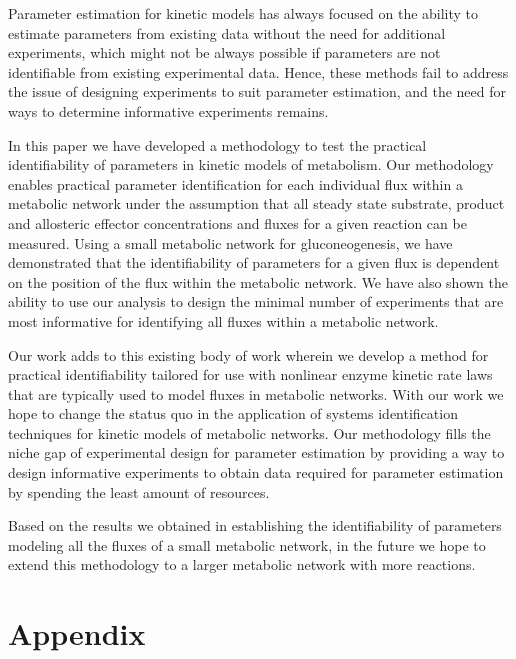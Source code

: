 \documentclass[10pt]{article}
\begin{document}
Parameter estimation for kinetic models has always focused on the ability to estimate parameters from existing data without the need for additional experiments, which might not be always possible if parameters are not identifiable from existing experimental data. Hence, these methods fail to address the issue of designing experiments to suit parameter estimation, and the need for ways to determine informative experiments remains. 

In this paper we have developed a methodology to test the practical identifiability of parameters in kinetic models of metabolism. Our methodology enables practical parameter identification for each individual flux within a metabolic network under the assumption that all steady state substrate, product and allosteric effector concentrations and fluxes for a given reaction can be measured. Using a small metabolic network for gluconeogenesis, we have demonstrated that the identifiability of parameters for a given flux is dependent on the position of the flux within the metabolic network. We have also shown the ability to use our analysis to design the minimal number of experiments that are most informative for identifying all fluxes within a metabolic network.

Our work adds to this existing body of work wherein we develop a method for practical identifiability tailored for use with nonlinear enzyme kinetic rate laws that are typically used to model fluxes in metabolic networks. With our work we hope to change the status quo in the application of systems identification techniques for kinetic models of metabolic networks. Our methodology fills the niche gap of experimental design for parameter estimation by providing a way to design informative experiments to obtain data required for parameter estimation by spending the least amount of resources.

Based on the results we obtained in establishing the identifiability of parameters modeling all the fluxes of a small metabolic network, in the future we hope to extend this methodology to a larger metabolic network with more reactions.

\section*{Appendix}
\end{document}
